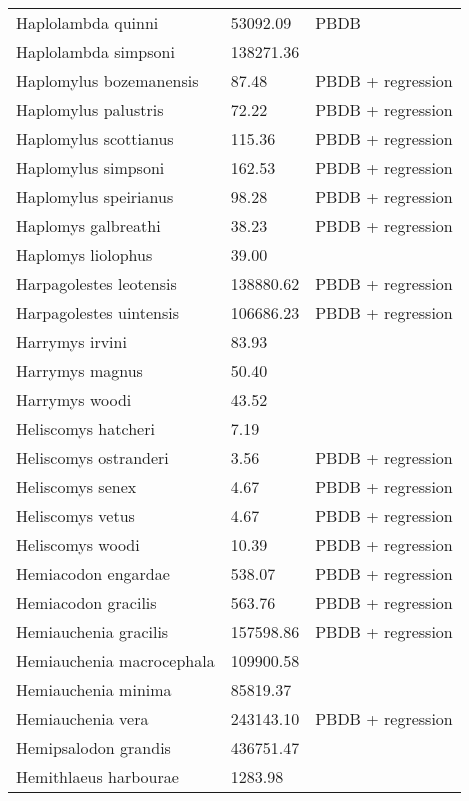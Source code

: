 \documentclass{article}
\begin{document}
\begin{center}
\begin{longtable}{p{} p{} p{}}
    Haplolambda quinni & 53092.09 & PBDB \\ 
    Haplolambda simpsoni & 138271.36 & \cite{Tedford1994} \\ 
    Haplomylus bozemanensis & 87.48 & PBDB + regression \\ 
    Haplomylus palustris & 72.22 & PBDB + regression \\ 
    Haplomylus scottianus & 115.36 & PBDB + regression \\ 
    Haplomylus simpsoni & 162.53 & PBDB + regression \\ 
    Haplomylus speirianus & 98.28 & PBDB + regression \\ 
    Haplomys galbreathi & 38.23 & PBDB + regression \\ 
    Haplomys liolophus & 39.00 & \cite{McKenna2011} \\ 
    Harpagolestes leotensis & 138880.62 & PBDB + regression \\ 
    Harpagolestes uintensis & 106686.23 & PBDB + regression \\ 
    Harrymys irvini & 83.93 & \cite{Tomiya2013} \\ 
    Harrymys magnus & 50.40 & \cite{Tomiya2013} \\ 
    Harrymys woodi & 43.52 & \cite{Kirk2011} \\ 
    Heliscomys hatcheri & 7.19 & \cite{Wilson2012} \\ 
    Heliscomys ostranderi & 3.56 & PBDB + regression \\ 
    Heliscomys senex & 4.67 & PBDB + regression \\ 
    Heliscomys vetus & 4.67 & PBDB + regression \\ 
    Heliscomys woodi & 10.39 & PBDB + regression \\ 
    Hemiacodon engardae & 538.07 & PBDB + regression \\ 
    Hemiacodon gracilis & 563.76 & PBDB + regression \\ 
    Hemiauchenia gracilis & 157598.86 & PBDB + regression \\ 
    Hemiauchenia macrocephala & 109900.58 & \cite{Smith2004} \\ 
    Hemiauchenia minima & 85819.37 & \cite{Tomiya2013} \\ 
    Hemiauchenia vera & 243143.10 & PBDB + regression \\ 
    Hemipsalodon grandis & 436751.47 & \cite{Scott1937} \\ 
    Hemithlaeus harbourae & 1283.98 & \cite{Loomis1932} \\ 

\end{longtable}
\end{center}
\end{document}
